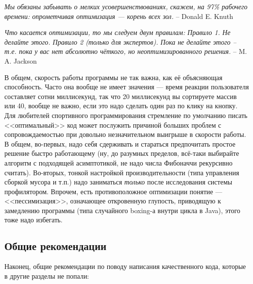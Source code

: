 \documentclass{../text-style}
\begin{document}
\textit{Мы обязаны забывать о мелких усовершенствованиях, ска­жем, на 97\% рабочего времени: опрометчивая оптимизация --- корень всех зол.} \newline
-- Donald E. Knuth

\textit{Что касается оптимизации, то мы следуем двум правилам: \newline
Правило 1. Не делайте этого. \newline
Правило 2 (только для экспертов). Пока не делайте этого -- т.е. пока у вас нет абсолютно чёткого, но неоптимизированного решения.} \newline
-- M. A. Jackson

В общем, скорость работы программы не так важна, как её объясняющая способность. Часто она вообще не имеет значения --- время реакции пользователя составляет сотни миллисекунд, так что 20 миллисекунд вы сортируете массив или 40, вообще не важно, если это надо сделать один раз по клику на кнопку. Для любителей спортивного программирования стремление по умолчанию писать <<оптимальный>> код может послужить причиной больших проблем с сопровождаемостью при довольно незначительном выигрыше в скорости работы. В общем, во-первых, надо себя сдерживать и стараться предпочитать простое решение быстро работающему (ну, до разумных пределов, всё-таки выбирайте алгоритм с подходящей асимптотикой, не надо числа Фибоначчи рекурсивно считать). Во-вторых, тонкой настройкой производительности (типа управления сборкой мусора и т.п.) надо заниматься \textit{только} после исследования системы профилятором. Впрочем, есть противоположное оптимизации понятие --- <<пессимизация>>, означающее откровенную глупость, приводящую к замедлению программы (типа случайного boxing-а внутри цикла в Java), этого тоже надо избегать.

\subsection{Общие рекомендации}

Наконец, общие рекомендации по поводу написания качественного кода, которые в другие разделы не попали:
\end{document}
